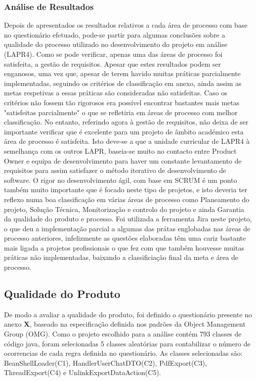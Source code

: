 \documentclass[openany,10pt,a4paper]{article}
\begin{document}
\subsubsection{Análise de Resultados}
Depois de apresentados os resultados relativos a cada área de processo com base no questionário efetuado, pode-se partir para algumas conclusões sobre a qualidade do processo utilizado no desenvolvimento do projeto em análise (LAPR4).
Como se pode verificar, apenas uma das áreas de processo foi satisfeita, a gestão de requisitos. Apesar que estes resultados podem ser enganosos, uma vez que, apesar de terem havido muitas práticas parcialmente implementadas, seguindo os critérios de classificação em anexo, ainda assim as metas respetivas a essas práticas são consideradas não satisfeitas.
Caso os critérios não fossem tão rigorosos era possível encontrar bastantes mais metas "satisfeitas parcialmente" o que se refletiria em áreas de processo com melhor classificação.
No entanto, referindo agora à gestão de requisitos, não deixa de ser importante verificar que é excelente para um projeto de âmbito académico esta área de processo é satisfeita. Isto deve-se a que a unidade curricular de LAPR4 à semelhança com os outros LAPR, baseia-se muito no contacto entre Product Owner e equipa de desenvolvimento para haver um constante levantamento de requisitos para assim satisfazer o método iterativo de desenvolvimento de software.
O rigor no desenvolvimento ágil, com base em SCRUM é um ponto também muito importante que é focado neste tipo de projetos, e isto deveria ter reflexo numa boa classificação em várias áreas de processo como Planeamento do projeto, Solução Técnica, Monitorização e controlo do projeto e ainda Garantia da qualidade do produto e processo. Foi utilizada a ferramenta Jira neste projeto, o que deu a implementação parcial a algumas das prátas englobadas nas áreas de processo anteriores, infelizmente as questões elaboradas têm uma cariz bastante mais ligada a projetos profissionais o que fez com que também houvesse muitas práticas não implementadas, baixando a classificiação final da meta e área de processo.

\subsection{Qualidade do Produto}
De modo a avaliar a qualidade do produto, foi definido o questionário presente no anexo \textbf{X}, baseado na especificação definida nos padrões da Object Management Group (OMG). Como o projeto escolhido para a análise contém 793 classes de código java, foram selecionadas 5 classes aleatórias para contabilizar o número de ocorrencias de cada regra definida no questionário. As classes selecionadas são: BeanShellLoader(C1), HandlerUserChatDTO(C2), PdfExport(C3), ThreadExport(C4) e UnlinkExportDataAction(C5).
\end{document}
